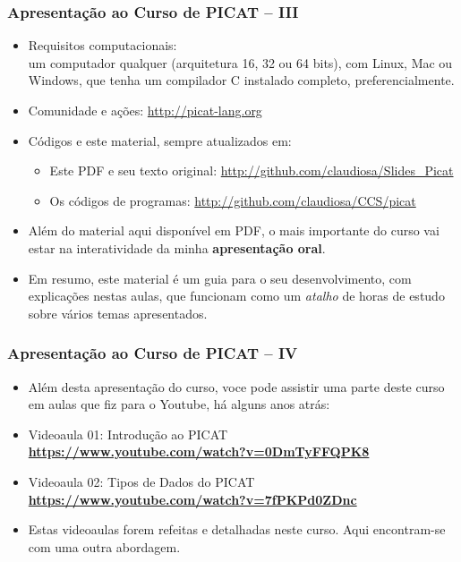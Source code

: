     
\begin{frame}[fragile]
  \frametitle{Apresentação ao Curso de PICAT -- III}
  \begin{itemize}

						
    \item Requisitos computacionais:\\
    \pause
    um computador qualquer (arquitetura 16, 32 ou 64 bits), com Linux, Mac ou Windows,
    que tenha um compilador C instalado completo, preferencialmente.

    \item Comunidade e ações: \url{http://picat-lang.org}
    \pause

    \item Códigos e este material, sempre atualizados em: 
    \pause
    \begin{itemize}
      \item  Este PDF e seu texto original:  \url{http://github.com/claudiosa/Slides_Picat}
     \item   Os códigos de programas:  \url{http://github.com/claudiosa/CCS/picat}
    \end{itemize}

			\item Além do material aqui disponível em PDF, o mais importante  do curso
			 vai estar na interatividade
			da minha \textbf{apresentação oral}. 
			
			\pause
			\item Em resumo, este material é  um guia para o seu desenvolvimento,
			 com explicações nestas aulas, que funcionam como um \textit{atalho} de
			horas de estudo sobre vários temas apresentados.

    
  \end{itemize}

\end{frame}


    
\begin{frame}[fragile]
  \frametitle{Apresentação ao Curso de PICAT -- IV}
  \begin{itemize}

    \item Além desta  apresentação do curso, voce pode assistir uma
    parte deste curso em aulas que fiz para o Youtube, há alguns anos atrás:

    \pause
    \item Videoaula 01: Introdução ao PICAT\\
    \textbf{\url {https://www.youtube.com/watch?v=0DmTyFFQPK8}}

    \pause 
    \item Videoaula 02: Tipos de Dados do PICAT\\
    \textbf{\url {https://www.youtube.com/watch?v=7fPKPd0ZDnc}} 
    
    \item Estas videoaulas forem refeitas e detalhadas neste curso.
    Aqui encontram-se com uma outra abordagem.
    
  \end{itemize}

\end{frame}





